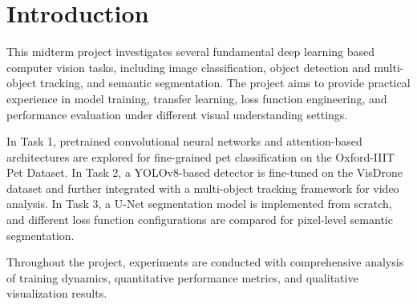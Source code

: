 \section{Introduction}

This midterm project investigates several fundamental deep learning based computer vision tasks, including image classification, object detection and multi-object tracking, and semantic segmentation. The project aims to provide practical experience in model training, transfer learning, loss function engineering, and performance evaluation under different visual understanding settings.

In Task 1, pretrained convolutional neural networks and attention-based architectures are explored for fine-grained pet classification on the Oxford-IIIT Pet Dataset. In Task 2, a YOLOv8-based detector is fine-tuned on the VisDrone dataset and further integrated with a multi-object tracking framework for video analysis. In Task 3, a U-Net segmentation model is implemented from scratch, and different loss function configurations are compared for pixel-level semantic segmentation.

Throughout the project, experiments are conducted with comprehensive analysis of training dynamics, quantitative performance metrics, and qualitative visualization results.
